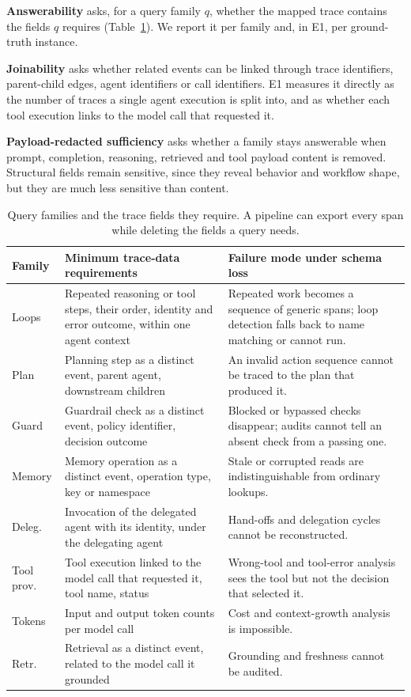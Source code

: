 \documentclass[conference]{IEEEtran}
\begin{document}
\textbf{Answerability} asks, for a query family $q$, whether the mapped
trace contains the fields $q$ requires (Table~\ref{tab:queries}). We
report it per family and, in E1, per ground-truth instance.

\textbf{Joinability} asks whether related events can be linked through
trace identifiers, parent-child edges, agent identifiers or call
identifiers. E1 measures it directly as the number of traces a single
agent execution is split into, and as whether each tool execution links
to the model call that requested it.

\textbf{Payload-redacted sufficiency} asks whether a family stays
answerable when prompt, completion, reasoning, retrieved and tool payload
content is removed. Structural fields remain sensitive, since they
reveal behavior and workflow shape, but they are much less sensitive
than content.

\begin{table}[t]
\centering
\scriptsize
\caption{Query families and the trace fields they require. A pipeline
can export every span while deleting the fields a query needs.}
\label{tab:queries}
\begin{tabular}{@{}p{}p{}p{}@{}}
\toprule
\textbf{Family} & \textbf{Minimum trace-data requirements} & \textbf{Failure mode under schema loss} \\
\midrule
Loops & Repeated reasoning or tool steps, their order, identity and error outcome, within one agent context & Repeated work becomes a sequence of generic spans; loop detection falls back to name matching or cannot run. \\
Plan & Planning step as a distinct event, parent agent, downstream children & An invalid action sequence cannot be traced to the plan that produced it. \\
Guard & Guardrail check as a distinct event, policy identifier, decision outcome & Blocked or bypassed checks disappear; audits cannot tell an absent check from a passing one. \\
Memory & Memory operation as a distinct event, operation type, key or namespace & Stale or corrupted reads are indistinguishable from ordinary lookups. \\
Deleg. & Invocation of the delegated agent with its identity, under the delegating agent & Hand-offs and delegation cycles cannot be reconstructed. \\
Tool prov. & Tool execution linked to the model call that requested it, tool name, status & Wrong-tool and tool-error analysis sees the tool but not the decision that selected it. \\
Tokens & Input and output token counts per model call & Cost and context-growth analysis is impossible. \\
Retr. & Retrieval as a distinct event, related to the model call it grounded & Grounding and freshness cannot be audited. \\
\bottomrule
\end{tabular}
\end{table}
\end{document}
